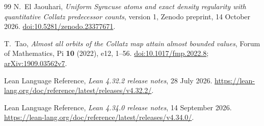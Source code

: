 \begin{thebibliography}{99}
N.~El Jaouhari, \emph{Uniform Syracuse atoms and exact density regularity
with quantitative Collatz predecessor counts}, version 1, Zenodo
preprint, 14 October 2026.
\href{https://doi.org/10.5281/zenodo.23377671}{doi:10.5281/zenodo.23377671}.

T.~Tao, \emph{Almost all orbits of the Collatz map attain almost bounded
values}, Forum of Mathematics, Pi \textbf{10} (2022), e12, 1--56.
\href{https://doi.org/10.1017/fmp.2022.8}{doi:10.1017/fmp.2022.8};
\href{https://arxiv.org/abs/1909.03562v7}{arXiv:1909.03562v7}.

Lean Language Reference, \emph{Lean 4.32.2 release notes}, 28 July 2026.
\url{https://lean-lang.org/doc/reference/latest/releases/v4.32.2/}.

Lean Language Reference, \emph{Lean 4.34.0 release notes}, 14 September 2026.
\url{https://lean-lang.org/doc/reference/latest/releases/v4.34.0/}.

\end{thebibliography}
\endgroup
